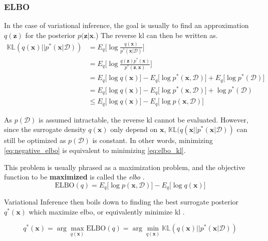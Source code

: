 \subsubsection{ELBO}
In the case of variational inference, the goal is usually to find an approximation $q(\mathbf{z})$ for the posterior $p(\mathbf{z} | \mathbf{x}$.) The reverse \acrshort{kl} can then be written as.
\begin{subequations}
\begin{align}
    \mathbb{KL}(q(\mathbf{x}) || p^*(\mathbf{x} | \mathcal{D})) &= E_q\big[\log \frac{q(\mathbf{x})}{p^*(\mathbf{x} | \mathcal{D})} \big]\label{eq:elbo_kl}\\
    &= E_q\big[\log \frac{q(\mathbf{z}) p^*(\mathbf{x})}{p^*(\mathbf{z}, \mathbf{x})} \big]\\
    &= E_q\big[\log q(\mathbf{x}) \big] - E_q\big[\log p^*(\mathbf{x}, \mathcal{D})] + E_q\big[\log p^*(\mathcal{D}) \big]\\
    &= E_q\big[\log q(\mathbf{x}) \big] - E_q\big[\log p^*(\mathbf{x}, \mathcal{D})] + \log p^*(\mathcal{D})\\
    &\leq E_q\big[\log q(\mathbf{x}) \big] - E_q\big[\log p(\mathbf{x}, \mathcal{D})]\label{eq:negative_elbo}
\end{align}
\end{subequations}

As $p(\mathcal{D})$ is assumed intractable, the reverse \acrshort{kl} cannot be evaluated. However, since the surrogate density $q(\mathbf{x})$ only depend on $\mathbf{x}$, $\mathbb{KL}(q(\mathbf{x} || p^*(\mathbf{x} | \mathcal{D}))$ can still be optimized as $p(\mathcal{D})$ is constant. In other words, minimizing \cref{eq:negative_elbo} is equivalent to minimizing \cref{eq:elbo_kl}.

This problem is usually phrased as a maximization problem, and the objective function to be \textbf{maximized} is called the \textit{\acrfull{elbo}} \cite{Blei_2017}.
\begin{equation}
    \text{ELBO}(q) = E_q\big[\log p(\mathbf{x}, \mathcal{D})] - E_q\big[\log q(\mathbf{x}) \big]
\end{equation}

Variational Inference then boils down to finding the best surrogate posterior $q^*(\mathbf{x})$ which maximize \acrshort{elbo}, or equivalently minimize \acrshort{kl} \cite{Blei_2017}.

\begin{equation}
    q^*(\mathbf{x}) = \arg \max_{q(\mathbf{x})} \text{ELBO}(q) = \arg \min_{q(\mathbf{x})} \mathbb{KL}(q(\mathbf{x}) || p^*(\mathbf{x} | \mathcal{D}))
\end{equation}



